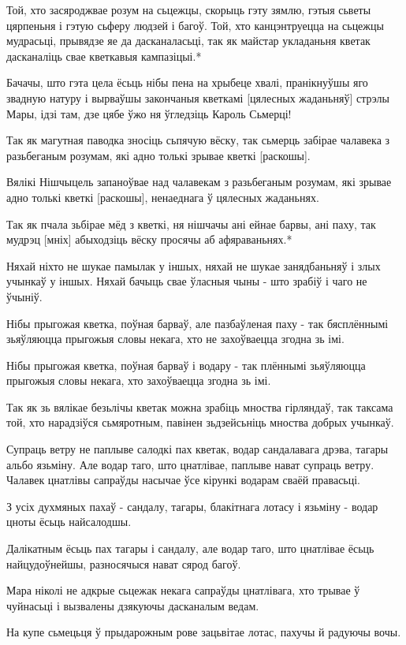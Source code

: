 \documentclass{article}
\begin{document}
Той, хто засяроджвае розум на сьцежцы, скорыць гэту зямлю, гэтыя
сьветы цярпеньня і гэтую сьферу людзей і багоў. Той, хто канцэнтруецца
на сьцежцы мудрасьці, прывядзе яе да дасканаласьці, так як майстар
укладаньня кветак дасканаліць свае кветкавыя кампазіцыі.*

Бачачы, што гэта цела ёсьць нібы пена на хрыбеце хвалі, пранікнуўшы
яго звадную натуру і вырваўшы закончаныя кветкамі {[}цялесных
жаданьняў{]} стрэлы Мары, ідзі там, дзе цябе ўжо ня ўгледзіць Кароль
Сьмерці!

Так як магутная паводка зносіць сьпячую вёску, так сьмерць забірае
чалавека з разьбеганым розумам, які адно толькі зрывае кветкі
{[}раскошы{]}.

Вялікі Нішчыцель запаноўвае над чалавекам з разьбеганым розумам, які
зрывае адно толькі кветкі {[}раскошы{]}, ненаеднага ў цялесных
жаданьнях.

Так як пчала зьбірае мёд з кветкі, ня нішчачы ані ейнае барвы, ані
паху, так мудрэц {[}мніх{]} абыходзіць вёску просячы аб афяраваньнях.*

Няхай ніхто не шукае памылак у іншых, няхай не шукае занядбаньняў і
злых учынкаў у іншых. Няхай бачыць свае ўласныя чыны - што зрабіў і чаго
не ўчыніў.

Нібы прыгожая кветка, поўная барваў, але пазбаўленая паху - так
бясплённымі зьяўляюцца прыгожыя словы некага, хто не захоўваецца згодна
зь імі.

Нібы прыгожая кветка, поўная барваў і водару - так плённымі
зьяўляюцца прыгожыя словы некага, хто захоўваецца згодна зь імі.

Так як зь вялікае безьлічы кветак можна зрабіць мноства гірляндаў,
так таксама той, хто нарадзіўся сьмяротным, павінен зьдзейсьніць мноства
добрых учынкаў.

Супраць ветру не паплыве салодкі пах кветак, водар сандалавага
дрэва, тагары альбо язьміну. Але водар таго, што цнатлівае, паплыве
нават супраць ветру. Чалавек цнатлівы сапраўды насычае ўсе кірункі
водарам сваёй правасьці.

З усіх духмяных пахаў - сандалу, тагары, блакітнага лотасу і язьміну
- водар цноты ёсьць найсалодшы.

Далікатным ёсьць пах тагары і сандалу, але водар таго, што цнатлівае
ёсьць найцудоўнейшы, разносячыся нават сярод багоў.

Мара ніколі не адкрые сьцежак некага сапраўды цнатлівага, хто трывае
ў чуйнасьці і вызвалены дзякуючы дасканалым ведам.

На купе сьмецьця ў прыдарожным рове зацьвітае лотас, пахучы й
радуючы вочы.
\end{document}
